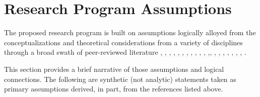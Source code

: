\section{Research Program Assumptions}

The proposed research program is built on assumptions logically alloyed from the conceptualizations and theoretical considerations from a variety of disciplines through a broad swath of peer-reviewed literature \citep{ingham_interactions_1985}, \citep{maeder_soil_2002}, \citep{polis_food_1996}, \citep{van_der_heijden_unseen_2008}, \citep{lavelle_faunal_1997-1}, \citep{kladivko_tillage_2001}, \citep{doran_soil_2000-1}, \citep{bongers_nematode_1999}, \citep{brussaard_soil_1998}, \citep{coleman_peds_2008}, \citep{sackett_linking_2010}, \citep{kardol_how_2010},\citep{van_der_putten_empirical_2009}, \citep{bardgett_belowground_2014}, \citep{scheller_forest_2004}, \citep{williams_simple_2010}, \citep{fath_ecological_2007}, \citep{harte_maximum_2011}, \citep{gianinazzi_impact_1994}, \citep{eigen_hypercycle_1979}, \citep{nicolis_exploring_1989}. 

This section provides a brief narrative of those assumptions and logical connections. The following are synthetic (not analytic) statements taken as primary assumptions derived, in part, from the references listed above.


